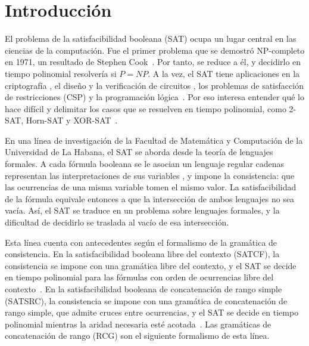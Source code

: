 \documentclass{report}
\begin{document}
\chapter*{Introducción}

El problema de la satisfacibilidad booleana (SAT) ocupa un lugar
central en las ciencias de la computación. Fue el primer problema que
se demostró NP-completo en 1971, un resultado de Stephen
Cook~\cite{cook1971}. Por tanto,  se reduce a él, y
decidirlo en tiempo polinomial resolvería si $P = NP$. A la vez, el
SAT tiene aplicaciones en la criptografía \agregaesto{[REF]}, el diseño y la verificación
de circuitos \agregaesto{[REF]}, los problemas de satisfacción de restricciones (CSP) \agregaesto{[REF]} y
la programación lógica~\cite{gu1997sat}.  Por eso interesa entender
qué lo hace difícil y delimitar los casos que se resuelven en tiempo
polinomial, como 2-SAT, Horn-SAT y XOR-SAT~\cite{schaefer1978}.

En una línea de investigación de la Facultad de Matemática y
Computación de la Universidad de La Habana, el SAT se aborda desde la
teoría de lenguajes formales. A cada fórmula booleana se le asocian un
lenguaje regular 
cadenas  representan las
interpretaciones de sus variables , y  impone la consistencia: que las ocurrencias de una misma variable
tomen el mismo valor. La satisfacibilidad de la fórmula equivale
entonces a que la intersección de ambos lenguajes no sea vacía.  Así,
el SAT se traduce en un problema sobre lenguajes formales, y la
dificultad de decidirlo se traslada al vacío de esa intersección.

Esta línea cuenta con antecedentes según el formalismo de la gramática de
consistencia. En la satisfacibilidad booleana libre del contexto (SATCF),
la consistencia se impone con una gramática libre del contexto, y el SAT
se decide en tiempo polinomial para las fórmulas con orden de ocurrencias
libre del contexto~\cite{fernandezarias2007}. En la satisfacibilidad
booleana de concatenación de rango simple (SATSRC), la consistencia se
impone con una gramática de concatenación de rango simple, que admite
cruces entre ocurrencias, y el SAT se decide en tiempo polinomial
mientras la aridad necesaria esté acotada~\cite{aguileralopez2016}. Las
gramáticas de concatenación de rango (RCG) son el siguiente formalismo de
esta línea. 
\end{document}
